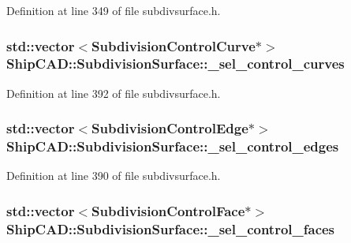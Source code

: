 Definition at line 349 of file subdivsurface.\-h.

\hypertarget{classShipCAD_1_1SubdivisionSurface_aeac6a33f098ee8dadfc9482edc1a60a5}{
\subsubsection[{\-\_\-sel\-\_\-control\-\_\-curves}]{\setlength{\rightskip}{0pt plus 5cm}std\-::vector$<${\bf Subdivision\-Control\-Curve}$\ast$$>$ Ship\-C\-A\-D\-::\-Subdivision\-Surface\-::\-\_\-sel\-\_\-control\-\_\-curves\hspace{0.3cm}{\ttfamily [protected]}}}\label{classShipCAD_1_1SubdivisionSurface_aeac6a33f098ee8dadfc9482edc1a60a5}


Definition at line 392 of file subdivsurface.\-h.

\hypertarget{classShipCAD_1_1SubdivisionSurface_a27011a827021fda5a4f2bb8828e157ca}{
\subsubsection[{\-\_\-sel\-\_\-control\-\_\-edges}]{\setlength{\rightskip}{0pt plus 5cm}std\-::vector$<${\bf Subdivision\-Control\-Edge}$\ast$$>$ Ship\-C\-A\-D\-::\-Subdivision\-Surface\-::\-\_\-sel\-\_\-control\-\_\-edges\hspace{0.3cm}{\ttfamily [protected]}}}\label{classShipCAD_1_1SubdivisionSurface_a27011a827021fda5a4f2bb8828e157ca}


Definition at line 390 of file subdivsurface.\-h.

\hypertarget{classShipCAD_1_1SubdivisionSurface_a612889fd7e746cca042c63b2ab2cd110}{
\subsubsection[{\-\_\-sel\-\_\-control\-\_\-faces}]{\setlength{\rightskip}{0pt plus 5cm}std\-::vector$<${\bf Subdivision\-Control\-Face}$\ast$$>$ Ship\-C\-A\-D\-::\-Subdivision\-Surface\-::\-\_\-sel\-\_\-control\-\_\-faces\hspace{0.3cm}{\ttfamily [protected]}}}\label{classShipCAD_1_1SubdivisionSurface_a612889fd7e746cca042c63b2ab2cd110}


